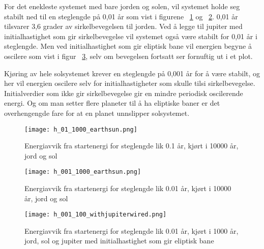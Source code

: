 \documentclass[a4paper, 12pt]{article}
\begin{document}
For det enekleste systemet med bare jorden og solen, vil systemet holde seg stabilt ned til en steglengde på 0,01 år som vist i figurene ~\ref{fig:h=01} og ~\ref{fig:h=001}. 0,01 år tilsvarer 3,6 grader av sirkelbevegelsen til jorden. Ved å legge til jupiter med initialhastighet som gir sirkelbevegelse vil systemet også være stabilt for 0,01 år i steglengde. Men ved initialhastighet som gir eliptisk bane vil energien begyne å oscilere som vist i figur ~\ref{fig:h=001jupiter}, selv om bevegelsen fortsatt ser fornuftig ut i et plot.

Kjøring av hele solsystemet krever en steglengde på 0,001 år for å være stabilt, og her vil energien oscilere selv for initialhastigheter som skulle tilsi sirkelbevegelse. Initialverdier som ikke gir sirkelbevegelse gir en mindre periodisk oscilerende energi. Og om man setter flere planeter til å ha eliptiske baner er det overhengengde fare for at en planet unnslipper solsystemet. 
\FloatBarrier

\begin{figure}[h]
\caption{Energiavvik fra startenergi for steglengde lik 0.1 år, kjørt i 10000 år, jord og sol}
\label{fig:h=01}
\centering
\texttt{[image: h\_01\_1000\_earthsun.png]}

\end{figure}
\FloatBarrier


\begin{figure}[h]
\caption{Energiavvik fra startenergi for steglengde lik 0.01 år, kjørt i 10000 år, jord og sol}
\label{fig:h=001}
\centering
\texttt{[image: h\_001\_1000\_earthsun.png]}

\end{figure}
\FloatBarrier

\begin{figure}[h]
\caption{Energiavvik fra startenergi for steglengde lik 0.01 år, kjørt i 1000 år, jord, sol og jupiter med initialhastighet som gir eliptisk bane}
\label{fig:h=001jupiter}
\centering
\texttt{[image: h\_001\_100\_withjupiterwired.png]}

\end{figure}
\FloatBarrier
\end{document}
